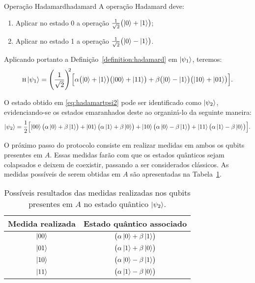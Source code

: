 \begin{definition}{Operação Hadamard}{hadamard}
  A operação Hadamard deve:
  \begin{enumerate}[label=\roman*.]
    \item Aplicar no estado 0 a operação $\frac{1}{\sqrt{2}} \bigl(\ket{0}+\ket{1}\bigr)$;
    \item Aplicar no estado 1 a operação $\frac{1}{\sqrt{2}} \bigl(\ket{0}-\ket{1}\bigr)$.
  \end{enumerate}
\end{definition}

Aplicando portanto a Definição~\ref{definition:hadamard} em $\ket{\psi_1}$, teremos:
\begin{equation}\label{eq:hadamartpsi2}
 \operatorname{\textsc{h}} \ket{\psi_1} = \Biggl( \frac{1}{\sqrt{2}}\Biggr)^{\!\!2} \Bigl[ \alpha \bigl( \ket{0} + \ket{1} \bigr)\bigl( \ket{00} +\ket{11} \bigr)+ \beta \bigl( \ket{0} - \ket{1} \bigr) \bigl( \ket{10} + \ket{01} \bigr) \Bigr].
\end{equation}

O estado obtido em \eqref{eq:hadamartpsi2} pode ser identificado como $\ket{\psi_2}$, evidenciando-se os estados emaranhados deste ao organizá-lo da seguinte maneira:
\begin{equation}\label{eq:psi2}
 \ket{\psi_2} = \frac{1}{2} \Bigl[ \ket{00} \bigl( \alpha \ket{0} + \beta \ket{1} \bigr) + \ket{01} \bigl( \alpha \ket{1} + \beta \ket{0} \bigr) + \ket{10} \bigl( \alpha \ket{0} - \beta \ket{1} \bigr) + \ket{11} \bigl( \alpha \ket{1} - \beta \ket{0} \bigr) \Bigr].
\end{equation}

O próximo passo do protocolo consiste em realizar medidas em ambos os qubits presentes em \(A\). Essas medidas farão com que os estados quânticos sejam colapsados e deixem de coexistir, passando a ser considerados clássicos. As medidas possíveis de serem obtidas em \(A\) são apresentadas na Tabela~\ref{tab:medidas}.

\begin{table}[ht!]
  \centering
  \caption{Possíveis resultados das medidas realizadas nos qubits presentes em \(A\) no estado quântico $\ket{\psi_2}$.}\label{tab:medidas}
  \begin{tabular}{cc}
    \toprule
    Medida realizada & Estado quântico associado\\
    \midrule
    $\ket{00}$   & $\bigl( \alpha \ket{0} + \beta \ket{1} \bigr)$\\
    $\ket{01}$   & $\bigl( \alpha \ket{1} + \beta \ket{0} \bigr)$\\
    $\ket{10}$   & $\bigl( \alpha \ket{0} - \beta \ket{1} \bigr)$\\
    $\ket{11}$   & $\bigl( \alpha \ket{1} - \beta \ket{0} \bigr)$\\
    \bottomrule
  \end{tabular}
\end{table}

